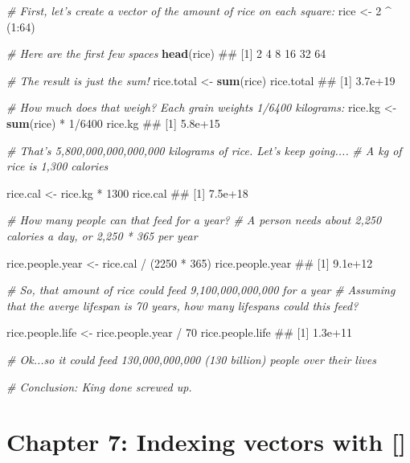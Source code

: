 \documentclass[]{book}
\newenvironment{Shaded}{\begin{snugshade}}{\end{snugshade}}
\newcommand{\KeywordTok}[1]{\textcolor[rgb]{0.13,0.29,0.53}{\textbf{{#1}}}}
\newcommand{\DecValTok}[1]{\textcolor[rgb]{0.00,0.00,0.81}{{#1}}}
\newcommand{\StringTok}[1]{\textcolor[rgb]{0.31,0.60,0.02}{{#1}}}
\newcommand{\CommentTok}[1]{\textcolor[rgb]{0.56,0.35,0.01}{\textit{{#1}}}}
\newcommand{\NormalTok}[1]{{#1}}
\theoremstyle{definition}
\theoremstyle{definition}
\theoremstyle{remark}
\begin{document}
\begin{Shaded}
\begin{Highlighting}[]
\CommentTok{# First, let's create a vector of the amount of rice on each square:}
\NormalTok{rice <-}\StringTok{ }\DecValTok{2} \NormalTok{^}\StringTok{ }\NormalTok{(}\DecValTok{1}\NormalTok{:}\DecValTok{64}\NormalTok{)}

\CommentTok{# Here are the first few spaces}
\KeywordTok{head}\NormalTok{(rice)}
\NormalTok{## [1]  2  4  8 16 32 64}

\CommentTok{# The result is just the sum!}
\NormalTok{rice.total <-}\StringTok{ }\KeywordTok{sum}\NormalTok{(rice)}
\NormalTok{rice.total}
\NormalTok{## [1] 3.7e+19}

\CommentTok{# How much does that weigh? Each grain weights 1/6400 kilograms:}
\NormalTok{rice.kg <-}\StringTok{ }\KeywordTok{sum}\NormalTok{(rice) *}\StringTok{ }\DecValTok{1}\NormalTok{/}\DecValTok{6400}
\NormalTok{rice.kg}
\NormalTok{## [1] 5.8e+15}

\CommentTok{# That's 5,800,000,000,000,000 kilograms of rice. Let's keep going....}
\CommentTok{# A kg of rice is 1,300 calories}

\NormalTok{rice.cal <-}\StringTok{ }\NormalTok{rice.kg *}\StringTok{ }\DecValTok{1300}
\NormalTok{rice.cal}
\NormalTok{## [1] 7.5e+18}

\CommentTok{# How many people can that feed for a year?}
\CommentTok{# A person needs about 2,250 calories a day, or 2,250 * 365 per year}

\NormalTok{rice.people.year <-}\StringTok{ }\NormalTok{rice.cal /}\StringTok{ }\NormalTok{(}\DecValTok{2250} \NormalTok{*}\StringTok{ }\DecValTok{365}\NormalTok{)}
\NormalTok{rice.people.year}
\NormalTok{## [1] 9.1e+12}

\CommentTok{# So, that amount of rice could feed 9,100,000,000,000 for a year}
\CommentTok{# Assuming that the averge lifespan is 70 years, how many lifespans could this feed?}

\NormalTok{rice.people.life <-}\StringTok{ }\NormalTok{rice.people.year /}\StringTok{ }\DecValTok{70}
\NormalTok{rice.people.life}
\NormalTok{## [1] 1.3e+11}

\CommentTok{# Ok...so it could feed 130,000,000,000 (130 billion) people over their lives}

\CommentTok{# Conclusion: King done screwed up.}
\end{Highlighting}
\end{Shaded}

\section{Chapter 7: Indexing vectors with
{[}{]}}\label{chapter-7-indexing-vectors-with}
\end{document}
